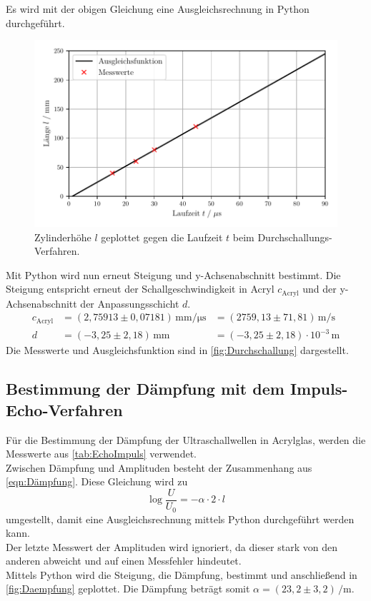  Es wird mit der obigen Gleichung eine Ausgleichsrechnung in Python durchgeführt.
  \begin{figure}
    \centering
    \includegraphics[width=15cm]{messwerte/Durchschallung.pdf}
    \caption{Zylinderhöhe $l$ geplottet gegen die Laufzeit $t$ beim Durchschallungs-Verfahren.}
    \label{fig:Durchschallung}
  \end{figure}
  Mit Python wird nun erneut Steigung und y-Achsenabschnitt bestimmt. Die Steigung entspricht erneut der 
  Schallgeschwindigkeit in Acryl $c_{\mathrm{Acryl}}$ und der y-Achsenabschnitt der Anpassungsschicht $d$.
  \begin{align*}
    c_{\mathrm{Acryl}} &= (2,75913 \pm 0,07181) \, \si{\milli\meter\per\micro\second} &= (2759,13 \pm 71,81) \, \si{\meter\per\second} \\
    d &= (-3,25 \pm 2,18) \, \si{\milli\meter} &= (-3,25 \pm 2,18) \cdot 10^{-3} \, \si{\meter}
  \end{align*}
  Die Messwerte und Ausgleichsfunktion sind in \autoref{fig:Durchschallung} dargestellt.

\subsection{Bestimmung der Dämpfung mit dem Impuls-Echo-Verfahren}

  Für die Bestimmung der Dämpfung der Ultraschallwellen in Acrylglas, werden die Messwerte 
  aus \autoref{tab:EchoImpuls} verwendet.\\
  Zwischen Dämpfung und Amplituden besteht der Zusammenhang aus \autoref{eqn:Dämpfung}. Diese Gleichung wird
  zu
  \begin{equation*}
    \log{\frac{U}{U_0}} = -\alpha \cdot 2 \cdot l
  \end{equation*}
  umgestellt, damit eine Ausgleichsrechnung mittels Python durchgeführt werden kann.\\
  Der letzte Messwert der Amplituden wird ignoriert, da dieser stark von den anderen abweicht und auf einen
  Messfehler hindeutet.\\
  Mittels Python wird die Steigung, die Dämpfung, bestimmt und anschließend in \autoref{fig:Daempfung} geplottet.
  Die Dämpfung beträgt somit $\alpha = (23,2 \pm 3,2) \, \si{\per\meter}$.

